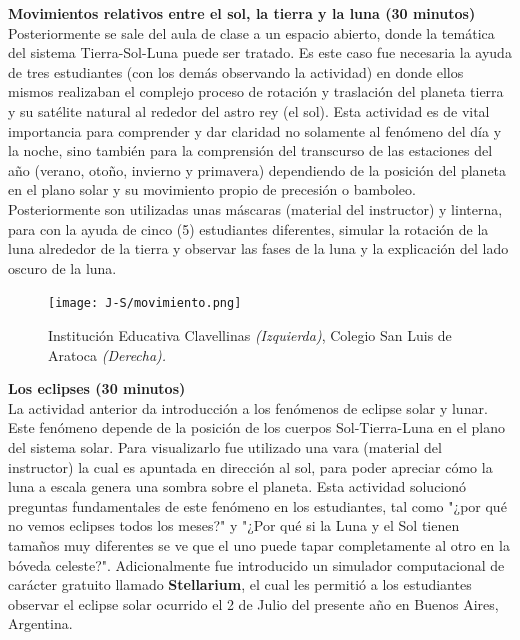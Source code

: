 \documentclass[a4paper,10pt]{article}
\begin{document}
\noindent \textbf{Movimientos relativos entre el sol, la tierra y la luna (30 minutos)}\\

\noindent Posteriormente se sale del aula de clase a un espacio abierto, donde la temática del sistema Tierra-Sol-Luna puede ser tratado. Es este caso fue necesaria la ayuda de tres estudiantes (con los demás observando la actividad) en donde ellos mismos realizaban el complejo proceso de rotación y traslación del planeta tierra y su satélite natural al rededor del astro rey (el sol). Esta actividad es de vital importancia para comprender y dar claridad no solamente al fenómeno del día y la noche, sino también para la comprensión del transcurso de las estaciones del año (verano, otoño, invierno y primavera) dependiendo de la posición del planeta en el plano solar y su movimiento propio de precesión o bamboleo. Posteriormente son utilizadas unas máscaras (material del instructor) y linterna, para con la ayuda de cinco (5) estudiantes diferentes, simular la rotación de la luna alrededor de la tierra y observar las fases de la luna y la explicación del lado oscuro de la luna.\\

\begin{figure}[H]
    \centering
    \texttt{[image: J-S/movimiento.png]}
    \caption{Institución Educativa Clavellinas \textit{(Izquierda)}, Colegio San Luis de Aratoca \textit{(Derecha).}}
    \label{fig: Luna}
\end{figure}

\noindent \textbf{Los eclipses (30 minutos)}\\


\noindent La actividad anterior da introducción a los fenómenos de eclipse solar y lunar. Este fenómeno depende de la posición de los cuerpos Sol-Tierra-Luna en el plano del sistema solar. Para visualizarlo fue utilizado una vara (material del instructor) la cual es apuntada en dirección al sol, para poder apreciar cómo la luna a escala genera una sombra sobre el planeta. Esta actividad solucionó preguntas fundamentales de este fenómeno en los estudiantes, tal como "¿por qué no vemos eclipses todos los meses?" y "¿Por qué si la Luna y el Sol tienen tamaños muy diferentes se ve que el uno puede tapar completamente al otro en la bóveda celeste?". Adicionalmente fue introducido un simulador computacional de carácter gratuito llamado \textbf{Stellarium}, el cual les permitió a los estudiantes observar el eclipse solar ocurrido el 2 de Julio del presente año en Buenos Aires, Argentina.\\
\end{document}
